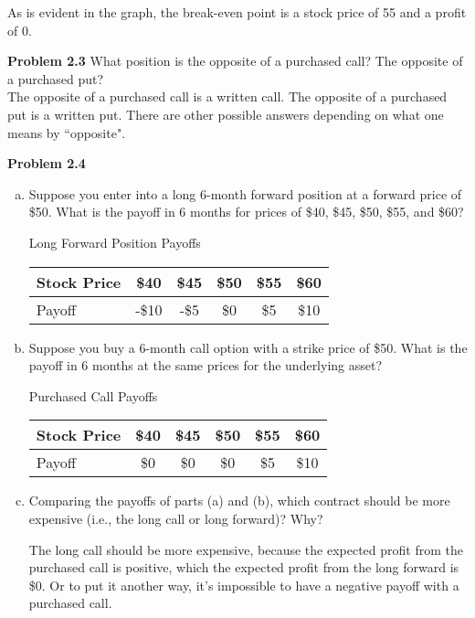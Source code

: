 \documentclass[12pt]{article}
\newcommand{\problem}[1]{\bigskip \noindent \textbf{Problem #1}}
\theoremstyle{plain}
\begin{document}
As is evident in the graph, the break-even point is a stock price of 55 and a profit of 0.

\problem{2.3} What position is the opposite of a purchased call? The opposite of a purchased put?\\

The opposite of a purchased call is a written call. The opposite of a purchased put is a written put. There are other possible answers depending on what one means by ``opposite".

\problem{2.4} 

\begin{enumerate}[(a)]
\item Suppose you enter into a long 6-month forward position at a forward price of \$50. What is the payoff in 6 months for prices of \$40, \$45, \$50, \$55, and \$60?

\begin{center}
Long Forward Position Payoffs\\
\begin{tabular}{l||ccccc}
Stock Price & \$40 & \$45 & \$50 & \$55 & \$60 \\ \hline \hline
Payoff & -\$10 & -\$5 & \$0 & \$5 & \$10
\end{tabular}
\end{center}

\item Suppose you buy a 6-month call option with a strike price of \$50. What is the payoff in 6 months at the same prices for the underlying asset?

\begin{center}
Purchased Call Payoffs\\
\begin{tabular}{l||ccccc}
Stock Price & \$40 & \$45 & \$50 & \$55 & \$60 \\ \hline \hline
Payoff & \$0 & \$0 & \$0 & \$5 & \$10
\end{tabular}
\end{center}

\item Comparing the payoffs of parts (a) and (b), which contract should be more expensive (i.e., the long call or long forward)? Why?

The long call should be more expensive, because the expected profit from the purchased call is positive, which the expected profit from the long forward is \$0. Or to put it another way, it's impossible to have a negative payoff with a purchased call.
\end{enumerate}
\end{document}
